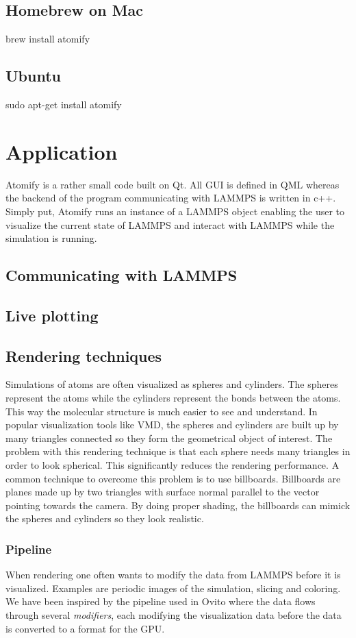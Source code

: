 \documentclass[aps,pre,twocolumn,letterpaper,floatfix,showpacs]{revtex4}
\begin{document}
\subsection{Homebrew on Mac}
brew install atomify

\subsection{Ubuntu}
sudo apt-get install atomify

\section{Application}
Atomify is a rather small code built on Qt. All GUI is defined in QML whereas the backend of the program communicating with LAMMPS is written in c++. Simply put, Atomify runs an instance of a LAMMPS object enabling the user to visualize the current state of LAMMPS and interact with LAMMPS while the simulation is running. 

\subsection{Communicating with LAMMPS}


\subsection{Live plotting}


\subsection{Rendering techniques}
Simulations of atoms are often visualized as spheres and cylinders. The spheres represent the atoms while the cylinders represent the bonds between the atoms. This way the molecular structure is much easier to see and understand. In popular visualization tools like VMD, the spheres and cylinders are built up by many triangles connected so they form the geometrical object of interest. The problem with this rendering technique is that each sphere needs many triangles in order to look spherical. This significantly reduces the rendering performance. A common technique to overcome this problem is to use billboards. Billboards are planes made up by two triangles with surface normal parallel to the vector pointing towards the camera. By doing proper shading, the billboards can mimick the spheres and cylinders so they look realistic.

\subsubsection*{Pipeline}
When rendering one often wants to modify the data from LAMMPS before it is visualized. Examples are periodic images of the simulation, slicing and coloring. We have been inspired by the pipeline used in Ovito where the data flows through several \textit{modifiers}, each modifying the visualization data before the data is converted to a format for the GPU.
\end{document}
